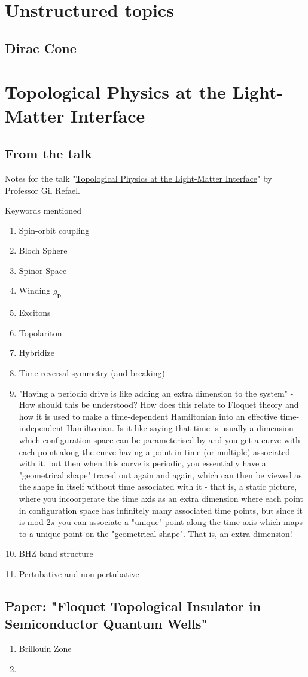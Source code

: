 \documentclass[a4paper]{article}
\begin{document}
    \section{Unstructured topics}
    \subsection{Dirac Cone}
    
    \section{Topological Physics at the Light-Matter Interface}
    \subsection{From the talk}
    Notes for the talk "\href{https://www.youtube.com/watch?v=LjHlAO46i0c&t=0s&ab_channel=AspenPhysics}{Topological Physics at the Light-Matter Interface}" by Professor Gil Refael.

    Keywords mentioned
    \begin{enumerate}
        \item Spin-orbit coupling
        \item Bloch Sphere
        \item Spinor Space
        \item Winding \(g_{\mathbf{p}}\) 
        \item Excitons
        \item Topolariton
        \item Hybridize
        \item Time-reversal symmetry (and breaking)
        \item "Having a periodic drive is like adding an extra dimension to the system" - How should this be understood? How does this relate to Floquet theory and how it is used to make a time-dependent Hamiltonian into an effective time-independent Hamiltonian. Is it like saying that time is usually a dimension which configuration space can be parameterised by and you get a curve with each point along the curve having a point in time (or multiple) associated with it, but then when this curve is periodic, you essentially have a "geometrical shape" traced out again and again, which can then be viewed as the shape in itself without time associated with it - that is, a static picture, where you incoorperate the time axis as an extra dimension where each point in configuration space has infinitely many associated time points, but since it is mod-\(2\pi\) you can associate a "unique" point along the time axis which maps to a unique point on the "geometrical shape". That is, an extra dimension!
        \item BHZ band structure
        \item Pertubative and non-pertubative
    \end{enumerate}

    \subsection{Paper: "Floquet Topological Insulator in Semiconductor Quantum Wells"}
    \begin{enumerate}
        \item Brillouin Zone
        \item 
    \end{enumerate}
    
\end{document}
